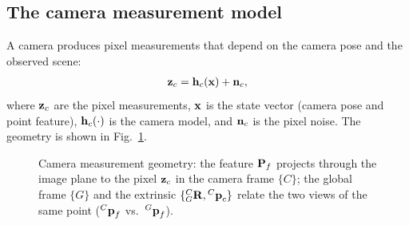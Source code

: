 \subsection{The camera measurement model}

A camera produces pixel measurements that depend on the camera pose and the observed scene:
\begin{align}
\boldsymbol{\mathbf{z}}_c = \boldsymbol{\mathbf{h}}_c(\boldsymbol{\mathbf{x}}) + \boldsymbol{\mathbf{n}}_c,
\end{align}
where $\boldsymbol{\mathbf{z}}_c$ are the pixel measurements, $\boldsymbol{\mathbf{x}}$ is the state vector (camera pose and point feature), $\boldsymbol{\mathbf{h}}_c(\cdot)$ is the camera model, and $\boldsymbol{\mathbf{n}}_c$ is the pixel noise. The geometry is shown in Fig.~\ref{fig:lec03-cammodel}.

\begin{figure}[H]
\centering
{}
\caption{Camera measurement geometry: the feature $\boldsymbol{\mathbf{P}}_f$ projects through the image plane to the pixel $\boldsymbol{\mathbf{z}}_c$ in the camera frame $\{C\}$; the global frame $\{G\}$ and the extrinsic $\{{}^{C}_{G}\boldsymbol{\mathbf{R}},{}^{C}\boldsymbol{\mathbf{p}}_c\}$ relate the two views of the same point (${}^{C}\boldsymbol{\mathbf{p}}_f$ vs.\ ${}^{G}\boldsymbol{\mathbf{p}}_f$).}
\label{fig:lec03-cammodel}
\end{figure}

